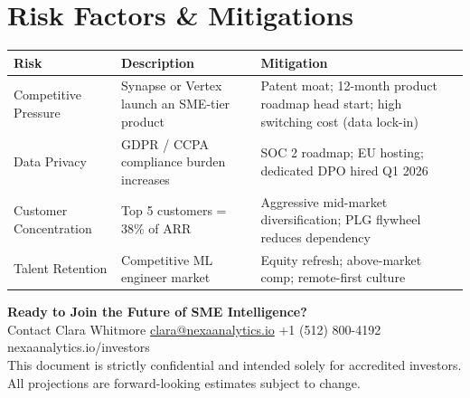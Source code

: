 \documentclass[11pt,a4paper]{article}
\newcommand{\sectionicon}[1]{\textcolor{NexaTeal}{#1}\hspace{4pt}}
\begin{document}
\section{\sectionicon{\faExclamationTriangle}Risk Factors \& Mitigations}

\begin{tabularx}{\linewidth}{@{}lXX@{}}
  \toprule
  \rowcolor{NexaNavy}
  \color{white}\textbf{Risk} &
  \color{white}\textbf{Description} &
  \color{white}\textbf{Mitigation} \\
  \midrule
  Competitive Pressure &
    Synapse or Vertex launch an SME-tier product &
    Patent moat; 12-month product roadmap head start; high switching cost (data lock-in) \\
  \rowcolor{NexaLight}
  Data Privacy &
    GDPR / CCPA compliance burden increases &
    SOC 2 roadmap; EU hosting; dedicated DPO hired Q1 2026 \\
  Customer Concentration &
    Top 5 customers = 38\% of ARR &
    Aggressive mid-market diversification; PLG flywheel reduces dependency \\
  \rowcolor{NexaLight}
  Talent Retention &
    Competitive ML engineer market &
    Equity refresh; above-market comp; remote-first culture \\
  \bottomrule
\end{tabularx}

\vspace{10pt}

\begin{tcolorbox}[
  enhanced,
  colback=NexaNavy, colframe=NexaNavy,
  arc=5pt, boxrule=0pt,
  left=14pt, right=14pt, top=10pt, bottom=10pt,
]
  \centering
  {\color{white}\large\bfseries Ready to Join the Future of SME Intelligence?}\\[6pt]
  {\color{NexaMid}\small
    Contact Clara Whitmore \textbullet{}
    \href{mailto:clara@nexaanalytics.io}{clara@nexaanalytics.io} \textbullet{}
    +1 (512) 800-4192 \textbullet{}
    nexaanalytics.io/investors}\\[6pt]
  {\color{NexaTeal}\faLock\enspace\small
    This document is strictly confidential and intended solely for accredited investors.
    All projections are forward-looking estimates subject to change.}
\end{tcolorbox}
\end{document}

